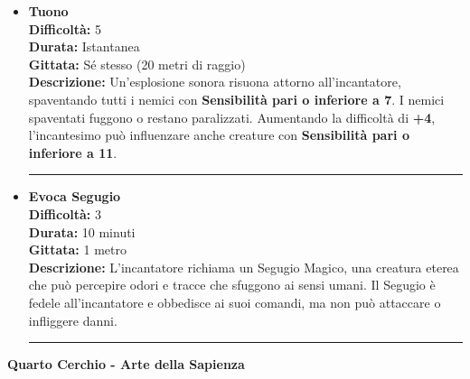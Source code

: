 \documentclass[./magie.tex]{subfiles}
\begin{document}
\begin{itemize}
\item \textbf{Tuono} \\
\textbf{Difficoltà:} 5 \\
\textbf{Durata:} Istantanea \\
\textbf{Gittata:} Sé stesso (20 metri di raggio) \\
\textbf{Descrizione:} Un'esplosione sonora risuona attorno all'incantatore, spaventando tutti i nemici con \textbf{Sensibilità pari o inferiore a 7}. I nemici spaventati fuggono o restano paralizzati. Aumentando la difficoltà di \textbf{+4}, l'incantesimo può influenzare anche creature con \textbf{Sensibilità pari o inferiore a 11}.

\vspace{0.2cm}
\noindent
\begin{center}
\rule{\textwidth}{0.4pt} 
\end{center}
\vspace{0.2cm}

\item \textbf{Evoca Segugio} \\
\textbf{Difficoltà:} 3 \\
\textbf{Durata:} 10 minuti \\
\textbf{Gittata:} 1 metro \\
\textbf{Descrizione:} L'incantatore richiama un Segugio Magico, una creatura eterea che può percepire odori e tracce che sfuggono ai sensi umani. Il Segugio è fedele all'incantatore e obbedisce ai suoi comandi, ma non può attaccare o infliggere danni.

\vspace{0.2cm}
\noindent
\begin{center}
\rule{\textwidth}{0.4pt} 
\end{center}
\vspace{0.2cm}

\end{itemize}

\clearpage
\vspace{0.2cm}
{\zarafirtitlefont\Large\bfseries Quarto Cerchio - Arte della Sapienza}
\end{document}
